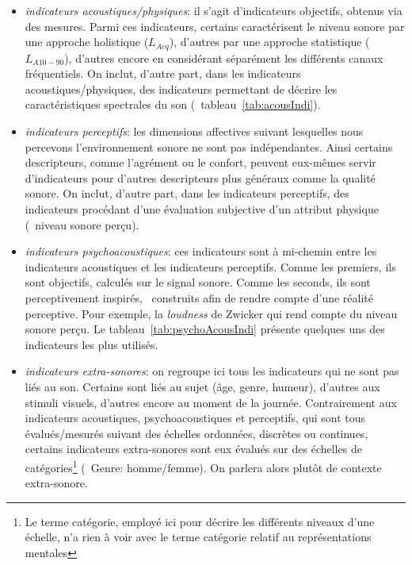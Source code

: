 \begin{itemize}
\begin{itemize}
\item \emph{indicateurs acoustiques/physiques}: il s'agit d'indicateurs objectifs, obtenus via des mesures. Parmi ces indicateurs, certains caractérisent le niveau sonore par une approche holistique ($L_{Aeq}$), d'autres par une approche statistique ($L_{A10-90}$), d'autres encore en considérant séparément les différents canaux fréquentiels. On inclut, d'autre part, dans les indicateurs acoustiques/physiques, des indicateurs permettant de décrire les caractéristiques spectrales du son (\cf~tableau~\ref{tab:acousIndi}).

\item \emph{indicateurs perceptifs}: les dimensions affectives suivant lesquelles nous percevons l'environnement sonore ne sont pas indépendantes. Ainsi certains descripteurs, comme l'agrément ou le confort, peuvent eux-mêmes servir d'indicateurs pour d'autres descripteurs plus généraux comme la qualité sonore. On inclut, d'autre part, dans les indicateurs perceptifs, des indicateurs procédant d'une évaluation subjective d'un attribut physique (\eg~niveau sonore perçu).

\item \emph{indicateurs psychoacoustiques}: ces indicateurs sont à mi-chemin entre les indicateurs acoustiques et les indicateurs perceptifs. Comme les premiers, ils sont objectifs, calculés sur le signal sonore. Comme les seconds, ils sont perceptivement inspirés, \ie~construits afin de rendre compte d'une réalité perceptive. Pour exemple, la \emph{loudness} de Zwicker \citep{zwicker2013psychoacoustics} qui rend compte du niveau sonore perçu. Le tableau~\ref{tab:psychoAcousIndi} présente quelques uns des indicateurs les plus utilisés.

\item \emph{indicateurs extra-sonores}: on regroupe ici tous les indicateurs qui ne sont pas liés au son. Certains sont liés au sujet (âge, genre, humeur), d'autres aux stimuli visuels, d'autres encore au moment de la journée. Contrairement aux indicateurs acoustiques, psychoacoustiques et perceptifs, qui sont tous évalués/mesurés suivant des échelles ordonnées, discrètes ou continues, certains indicateurs extra-sonores sont eux évalués sur des échelles de catégories\footnote{Le terme catégorie, employé ici pour décrire les différents niveaux d'une échelle, n'a rien à voir avec le terme catégorie relatif au représentations mentales} (\eg~Genre: homme/femme). On parlera alors plutôt de contexte extra-sonore.
\end{itemize}

\end{itemize}

